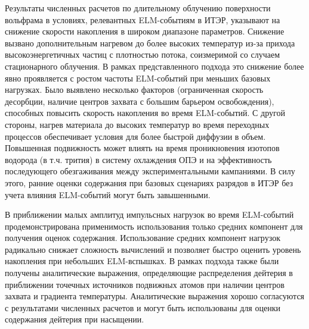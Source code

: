 Результаты численных расчетов по длительному облучению поверхности вольфрама в условиях, релевантных ELM-событиям в ИТЭР, указывают на снижение скорости накопления в широком диапазоне параметров. Снижение вызвано дополнительным нагревом до более высоких температур из-за прихода высокоэнергетичных частиц с плотностью потока, соизмеримой со случаем стационарного облучения. В рамках представленного подхода это снижение более явно проявляется с ростом частоты ELM-событий при меньших базовых нагрузках. Было выявлено несколько факторов (ограниченная скорость десорбции, наличие центров захвата с большим барьером освобождения), способных повысить скорость накопления во время ELM-событий. С другой стороны, нагрев материала до высоких температур во время переходных процессов обеспечивает условия для более быстрой диффузии в объем. Повышенная подвижность может влиять на время проникновения изотопов водорода (в т.ч. трития) в систему охлаждения ОПЭ и на эффективность последующего обезгаживания между экспериментальными кампаниями. В силу этого, ранние оценки содержания при базовых сценариях разрядов в ИТЭР без учета влияния ELM-событий могут быть завышенными. 

В приближении малых амплитуд импульсных нагрузок во время ELM-событий продемонстрирована применимость использования только средних компонент для получения оценок содержания. Использование средних компонент нагрузок радикально снижает сложность вычислений и позволяет быстро оценить уровень накопления при небольших ELM-вспышках. В рамках подхода также были получены аналитические выражения, определяющие распределения дейтерия в приближении точечных источников подвижных атомов при наличии центров захвата и градиента температуры. Аналитические выражения хорошо согласуются с результатами численных расчетов и могут быть использованы для оценки содержания дейтерия при насыщении.

\clearpage
